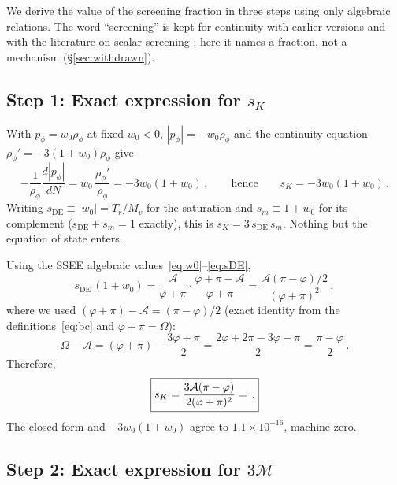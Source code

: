 \documentclass[12pt,a4paper]{article}
\newcommand{\phiG}{\varphi}
\newcommand{\MIRA}{\mathcal{M}}
\newcommand{\AURA}{\mathcal{A}}
\newcommand{\sK}{s_K}          %
\newcommand{\sDE}{s_{\mathrm{DE}}} %
\renewcommand{\Omega}{\varOmega}
\begin{document}
We derive the value of the screening fraction in three steps using only
algebraic relations. The word ``screening'' is kept for continuity with
earlier versions and with the literature on scalar screening
\citep{Vainshtein1972,Babichev2013}; here it names a fraction, not a
mechanism (§\ref{sec:withdrawn}).

\subsection{Step 1: Exact expression for $\sK$}
\label{sec:step1}

With $p_\phi = w_0\rho_\phi$ at fixed $w_0<0$, $|p_\phi|=-w_0\rho_\phi$ and the
continuity equation $\rho_\phi' = -3(1+w_0)\rho_\phi$ give
\begin{equation}
  -\frac{1}{\rho_\phi}\frac{d|p_\phi|}{dN}
    = w_0\,\frac{\rho_\phi'}{\rho_\phi}
    = -3w_0(1+w_0)\,,
  \qquad\text{hence}\qquad
  \sK = -3w_0(1+w_0)\,.
  \label{eq:sK_exact}
\end{equation}
Writing $\sDE \equiv |w_0| = T_r/M_v$ for the saturation and
$s_m \equiv 1+w_0$ for its complement ($\sDE + s_m = 1$ exactly), this is
$\sK = 3\,\sDE\,s_m$.  Nothing but the equation of state enters.

Using the SSEE algebraic values~\eqref{eq:w0}--\eqref{eq:sDE},
\begin{equation}
  \sDE\,(1+w_0) = \frac{\AURA}{\phiG+\pi}\cdot\frac{\phiG+\pi-\AURA}{\phiG+\pi}
  = \frac{\AURA(\pi-\phiG)/2}{(\phiG+\pi)^2}\,,
  \label{eq:OmDE_1pw0}
\end{equation}
where we used $(\phiG+\pi)-\AURA = (\pi-\phiG)/2$ (exact identity from
the definitions~\eqref{eq:bc} and $\phiG+\pi = \Omega$):
\begin{equation}
  \Omega - \AURA = (\phiG+\pi) - \frac{3\phiG+\pi}{2}
  = \frac{2\phiG+2\pi-3\phiG-\pi}{2} = \frac{\pi-\phiG}{2}\,.
  \label{eq:Omega_minus_AURA}
\end{equation}
Therefore,
\begin{equation}
  \boxed{
    \sK = \frac{3\AURA(\pi-\phiG)}{2(\phiG+\pi)^2} = \val{S_K_d12}\,.
  }
  \label{eq:alphaK_algebraic}
\end{equation}
The closed form and $-3w_0(1+w_0)$ agree to $1.1\times10^{-16}$, machine zero.

\subsection{Step 2: Exact expression for $3\MIRA$}
\label{sec:step2}
\end{document}
